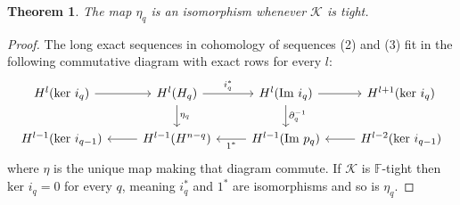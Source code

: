 \documentclass[a4paper]{amsart}
\newtheorem{thm}{Theorem}[section]
\theoremstyle{definition}
\def\K{\mathcal{K}}
\def\ker{\text{ker }}
\def\im{\text{Im }}
\def\F{\mathbb{F}}
\begin{document}
\begin{thm}\label{maindouble}
    The map $\eta_q$ is an isomorphism whenever $\K$ is tight.      
\end{thm}
\begin{proof}
    The long exact sequences in cohomology of sequences (2) and (3) fit in the following commutative diagram with exact rows for every $l$:
        \[\begin{tikzcd}
{H^l(\ker i_q)} & {H^l(H_q)} & {H^l(\im i_q)} & {H^{l+1}(\ker i_q)} \\
 {H^{l-1}(\ker i_{q-1})} & {H^{l-1}(H^{n-q})} & {H^{l-1}(\im p_q)} & {H^{l-2}(\ker i_{q-1})}
	\arrow[from=1-1, to=1-2]
	\arrow["i_q^*",from=1-2, to=1-3]
	\arrow["\eta_{q}", from=1-2, to=2-2]
	\arrow[from=1-3, to=1-4]
	\arrow["\partial_q^{-1}", from=1-3, to=2-3]
	\arrow["1^*" ,from=2-3, to=2-2]
	\arrow[from=2-4, to=2-3]
    \arrow[from=2-2,to=2-1]
\end{tikzcd}\]
where $\eta$ is the unique map making that diagram commute. If $\K$ is $\F$-tight then $\ker{i_q}=0$ for every $q$, meaning $i_q^*$ and $1^*$ are isomorphisms and so is $\eta_q$.
\end{proof}
\end{document}

